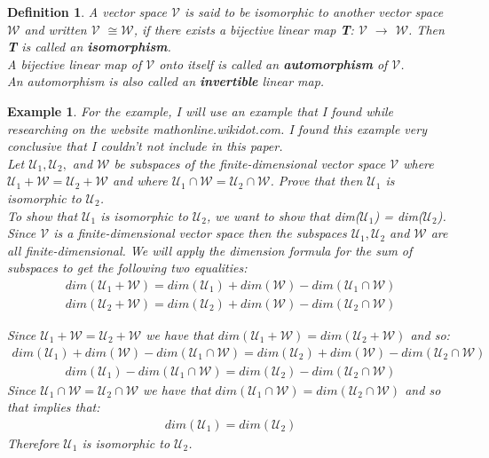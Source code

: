 \documentclass[12pt,a4paper]{article}
\newtheorem{defn}[thm]{Definition}
\newtheorem{exmp}{Example}[section]
\begin{document}
\begin{defn}
A vector space $\mathcal{V}$ is said to be isomorphic to another vector space $\mathcal{W}$ and written $\mathcal{V}$ ${\cong}$$\mathcal{W}$, if there exists a bijective linear map \textbf{T}:
$\mathcal{V}$ $\to$ $\mathcal{W}$. Then \textbf{T} is called an \textbf{isomorphism}.  \\A bijective linear map of $\mathcal{V}$ onto itself is called an \textbf{automorphism} of $\mathcal{V}$. \\An automorphism is also called an \textbf{invertible} linear map. 
\end{defn}
\begin{exmp}
For the example, I will use an example that I found while researching on the website mathonline.wikidot.com. I found this example very conclusive that I couldn't not include in this paper.\\
Let $\mathcal{U}_1, \mathcal{U}_2,$ and $\mathcal{W}$ be subspaces of the finite-dimensional vector space $\mathcal{V}$ where $\mathcal{U}_1 + \mathcal{W} = \mathcal{U}_2 + \mathcal{W}$ and where $\mathcal{U}_1 \cap \mathcal{W} = \mathcal{U}_2 \cap \mathcal{W}$. Prove that then $\mathcal{U}_1$ is isomorphic to $\mathcal{U}_2$.
\\
To show that $\mathcal{U}_1$ is isomorphic to $\mathcal{U}_2$, we want to show that dim($\mathcal{U}_1$) = dim($\mathcal{U}_2$).\\
Since $\mathcal{V}$ is a finite-dimensional vector space then the subspaces $\mathcal{U}_1, \mathcal{U}_2$ and $\mathcal{W}$ are all finite-dimensional. We will apply the dimension formula for the sum of subspaces to get the following two equalities:
\begin{align*}
dim(\mathcal{U}_1 + \mathcal{W}) = dim(\mathcal{U}_1) + dim(\mathcal{W}) - dim(\mathcal{U}_1 \cap \mathcal{W})
\end{align*}
\begin{align*}
dim(\mathcal{U}_2 + \mathcal{W}) = dim(\mathcal{U}_2) + dim(\mathcal{W}) - dim(\mathcal{U}_2 \cap \mathcal{W})
\end{align*}

Since $\mathcal{U}_1 + \mathcal{W} = \mathcal{U}_2 + \mathcal{W}$ we have that $dim(\mathcal{U}_1 + \mathcal{W}) = dim(\mathcal{U}_2 + \mathcal{W})$ and so:
\begin{align*}
dim(\mathcal{U}_1) + dim(\mathcal{W}) - dim(\mathcal{U}_1 \cap \mathcal{W}) = dim(\mathcal{U}_2) + dim(\mathcal{W}) - dim(\mathcal{U}_2 \cap \mathcal{W}) 
\end{align*}
\begin{align*}
dim(\mathcal{U}_1) - dim(\mathcal{U}_1 \cap \mathcal{W}) = dim(\mathcal{U}_2) - dim(\mathcal{U}_2 \cap \mathcal{W})
\end{align*}
Since $\mathcal{U}_1 \cap \mathcal{W} = \mathcal{U}_2 \cap \mathcal{W}$ we have that $dim(\mathcal{U}_1 \cap \mathcal{W}) = dim(\mathcal{U}_2 \cap \mathcal{W})$ and so that implies that:
\begin{align*}
dim(\mathcal{U}_1) = dim(\mathcal{U}_2)
\end{align*}
Therefore $\mathcal{U}_1$ is isomorphic to $\mathcal{U}_2$.
\end{exmp}
\end{document}
